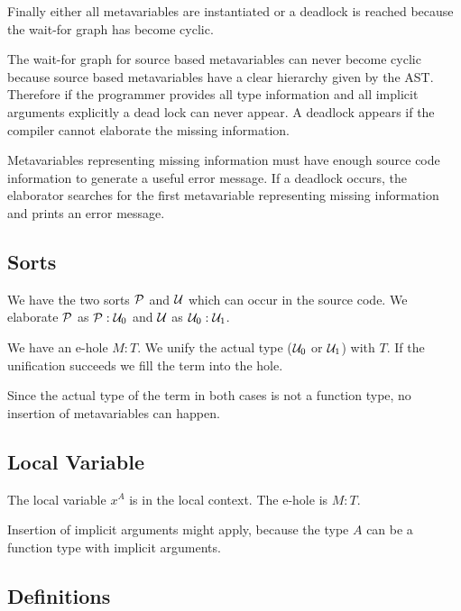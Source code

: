 Finally either all metavariables are instantiated or a deadlock is reached
because the wait-for graph has become cyclic.

The wait-for graph for source based metavariables can never become cyclic
because source based metavariables have a clear hierarchy given by the AST.
Therefore if the programmer provides all type information and all implicit
arguments explicitly a dead lock can never
appear. A deadlock appears if the compiler cannot elaborate the missing
information.

Metavariables representing missing information must have enough source code
information to generate a useful error message. If a deadlock occurs, the
elaborator searches for the first metavariable representing missing
information and prints an error message.






\subsection{Sorts}

We have the two sorts ${\mathcal P}$ and ${\mathcal U}$ which can occur in the source code. We
elaborate ${\mathcal P}$ as ${\mathcal P} : {\mathcal U}_0$ and ${\mathcal U}$ as ${\mathcal U}_0 : {\mathcal U}_1$.

We have an e-hole $M: T$. We unify the actual type (${\mathcal U}_0$ or ${\mathcal U}_1$) with
$T$. If the unification succeeds we fill the term into the hole.

Since the actual type of the term in both cases is not a function type, no
insertion of metavariables can happen.






\subsection{Local Variable}


The local variable $x^A$ is in the local context. The e-hole is $M: T$.

Insertion of implicit arguments might apply, because the type $A$ can be a
function type with implicit arguments.




\subsection{Definitions}


